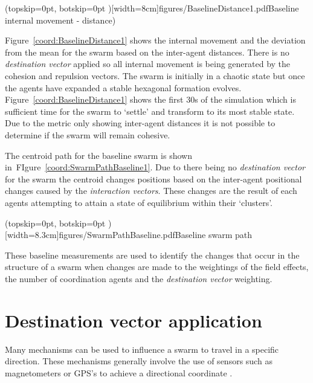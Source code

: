 \documentclass{ieeeaccess}
\begin{document}

\Figure[t!](topskip=0pt, botskip=0pt )[width=8cm]{figures/BaselineDistance1.pdf}{Baseline internal movement - distance)\label{coord:BaselineDistance1}}

Figure~\ref{coord:BaselineDistance1} shows the internal movement and the deviation from the mean for the swarm based on the inter-agent distances. There is no \textit{destination vector} applied so all internal movement is being generated by the cohesion and repulsion vectors. The swarm is initially in a chaotic state but once the agents have expanded a stable hexagonal formation evolves. Figure~\ref{coord:BaselineDistance1} shows the first 30s of the simulation which is sufficient time for the swarm to `settle' and transform to its most stable state. Due to the metric only showing inter-agent distances it is not possible to determine if the swarm will remain cohesive.

The centroid path for the baseline swarm is shown in~FIgure~\ref{coord:SwarmPathBaseline1}. Due to there being no \textit{destination vector} for the swarm the centroid changes positions based on the inter-agent positional changes caused by the \textit{interaction vectors}. These changes are the result of each agents attempting to attain a state of equilibrium within their `clusters'.


\Figure[t!](topskip=0pt, botskip=0pt )[width=8.3cm]{figures/SwarmPathBaseline.pdf}{Baseline swarm path\label{coord:SwarmPathBaseline1}}

These baseline measurements are used to identify the changes that occur in the structure of a swarm when changes are made to the weightings of the field effects, the number of coordination agents and the \textit{destination vector} weighting.

\section{Destination vector application}\label{sec:DestinationApp}
Many mechanisms can be used to influence a swarm to travel in a specific direction. These mechanisms generally involve the use of sensors such as magnetometers or GPS's to achieve a directional coordinate \cite{SG:15,TG:12}. 
\end{document}
